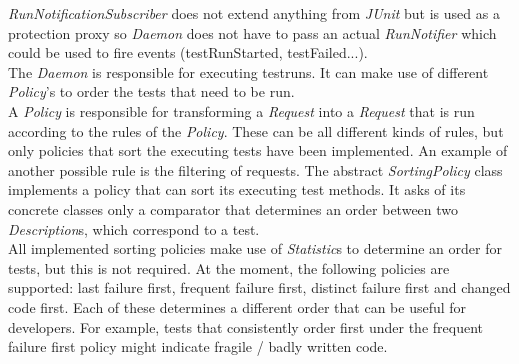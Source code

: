 \documentclass[i2]{oss}
\newcommand{\class}[1]{\emph{#1}}
\newcommand{\junit}{\emph{JUnit }}
\begin{document}
\class{RunNotificationSubscriber} does not extend anything from 
\junit but is used as a protection proxy so \class{Daemon} does not have 
to pass an actual \class{RunNotifier} which could be used to fire events 
(testRunStarted, testFailed...). \\

The \class{Daemon} is responsible for executing testruns.
It can make use of different \class{Policy}'s to order the tests that 
need to be run. \\

A \class{Policy} is responsible for transforming a \class{Request} into a \class{Request} that is run according to the rules of the \class{Policy}. 
These can be all different kinds of rules, but only policies that sort the executing tests have been implemented. 
An example of another possible rule is the filtering of requests.
The abstract \class{SortingPolicy} class implements a policy that can sort its executing test methods. It asks of its concrete classes only a comparator that determines an order between two \class{Description}s, which correspond to a test.\\
All implemented sorting policies make use of \class{Statistic}s to determine
an order for tests, but this is not required.
At the moment, the following policies are supported: last failure first, 
frequent failure first, distinct failure first and changed code 
first.
Each of these determines a different order that can be useful for
developers.
For example, tests that consistently order first under the frequent
failure first policy might indicate fragile / badly written code. \\
\end{document}

